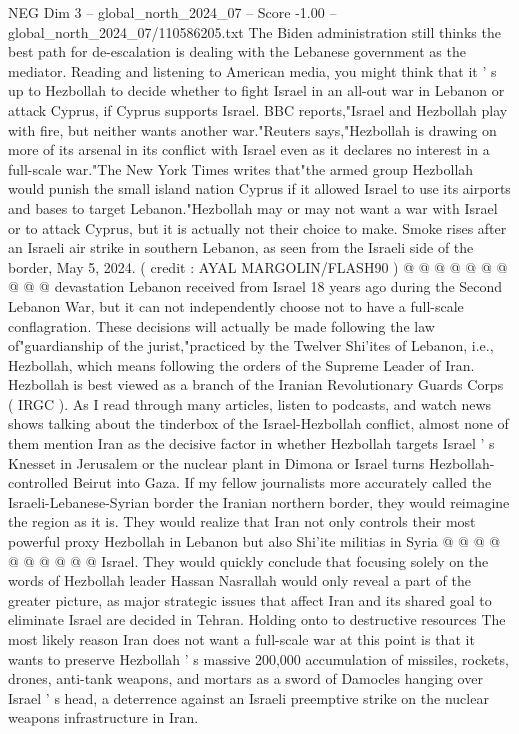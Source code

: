 \begin{textsample}{NEG Dim 3 – global\_north\_2024\_07 – Score -1.00 – global\_north\_2024\_07/110586205.txt}  \label{ex:f3_neg_369}
The Biden administration still thinks the best path for de-escalation is dealing with the Lebanese government as the mediator.
Reading and listening to American media, you might think that it ' s up to Hezbollah to decide whether to fight Israel in an all-out war in Lebanon or attack Cyprus, if Cyprus supports Israel.
BBC reports,"Israel and Hezbollah play with fire, but neither wants another war."Reuters says,"Hezbollah is drawing on more of its arsenal in its conflict with Israel even as it declares no interest in a full-scale war."The New York Times writes that"the armed group Hezbollah would punish the small island nation Cyprus if it allowed Israel to use its airports and bases to target Lebanon."Hezbollah may or may not want a war with Israel or to attack Cyprus, but it is actually not their choice to make.
Smoke rises after an Israeli air strike in southern Lebanon, as seen from the Israeli side of the border, May 5, 2024. ( credit : AYAL MARGOLIN/FLASH90 ) @ @ @ @ @ @ @ @ @ @ devastation Lebanon received from Israel 18 years ago during the Second Lebanon War, but it can not independently choose not to have a full-scale conflagration.
These decisions will actually be made following the law of"guardianship of the jurist,"practiced by the Twelver Shi'ites of Lebanon, i.e., Hezbollah, which means following the orders of the Supreme Leader of Iran.
Hezbollah is best viewed as a branch of the Iranian Revolutionary Guards Corps ( IRGC ).
As I read through many articles, listen to podcasts, and watch news shows talking about the tinderbox of the Israel-Hezbollah conflict, almost none of them mention Iran as the decisive factor in whether Hezbollah targets Israel ' s Knesset in Jerusalem or the nuclear plant in Dimona or Israel turns Hezbollah-controlled Beirut into Gaza.
If my fellow journalists more accurately called the Israeli-Lebanese-Syrian border the Iranian northern border, they would reimagine the region as it is.
They would realize that Iran not only controls their most powerful proxy Hezbollah in Lebanon but also Shi'ite militias in Syria @ @ @ @ @ @ @ @ @ @ Israel.
They would quickly conclude that focusing solely on the words of Hezbollah leader Hassan Nasrallah would only reveal a part of the greater picture, as major strategic issues that affect Iran and its shared goal to eliminate Israel are decided in Tehran.
Holding onto to destructive resources The most likely reason Iran does not want a full-scale war at this point is that it wants to preserve Hezbollah ' s massive 200,000 accumulation of missiles, rockets, drones, anti-tank weapons, and mortars as a sword of Damocles hanging over Israel ' s head, a deterrence against an Israeli preemptive strike on the nuclear weapons infrastructure in Iran.

\end{textsample}
